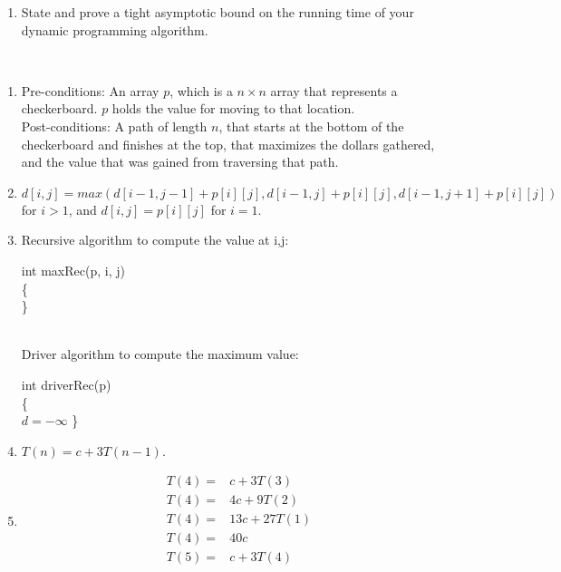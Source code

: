 \documentclass{assignment}
\begin{document}
\begin{problemlist}
\begin{problem}
\begin{enumerate}
\item State and prove a tight asymptotic bound on the running time of your dynamic programming algorithm.
\end{enumerate}
\end{problem}
\clearpage
\begin{answer}
\\
\begin{enumerate}
\item
Pre-conditions: An array $p$, which is a $n\times n$ array that represents a checkerboard. $p$ holds the value for moving to that location.\\
Post-conditions: A path of length $n$, that starts at the bottom of the checkerboard and finishes at the top, that maximizes the dollars gathered, and the value that was gained from traversing that path.\\
\item
$d[i,j] = max(d[i-1, j-1] + p[i][j], d[i-1, j] + p[i][j], d[i-1, j+1] + p[i][j])$ for $i>1$, and $d[i,j]=p[i][j]$ for $i=1$.\\
\item
Recursive algorithm to compute the value at i,j:\\
\IncMargin{3em}
\begin{algorithm}
  int maxRec(p, i, j)\\\{\\
  \Indp
  \Indm
  \}
\end{algorithm}
\DecMargin{3em}
\\Driver algorithm to compute the maximum value:
\IncMargin{3em}
\begin{algorithm}
  int driverRec(p)\\\{\\
  \Indp
  $d=-\infty$\;
  \Indm
  \}
\end{algorithm}
\DecMargin{3em}
\item
$T(n) = c + 3T(n-1)$.\\
\clearpage
\item
\begin{align*}
T(4) = &c + 3T(3)\\
T(4) = &4c + 9T(2)\\
T(4) = &13c + 27T(1)\\
T(4) = &40c\\
T(5) = &c + 3T(4)\\

\end{align*}
\end{enumerate}
\end{answer}
\end{problemlist}
\end{document}
